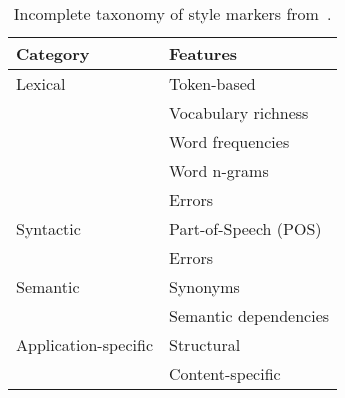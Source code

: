 \begin{table}[h]
    \centering
    \caption[Incomplete taxonomy of style markers.]{Incomplete taxonomy of style markers from~\citet{stamatatos_survey_2009}.}
    \label{tab:stylometric_features}
 
    \begin{tabular}{@{}ll@{}} %
    \toprule
    \textbf{Category} & \textbf{Features} \\ 
    \midrule
    Lexical & Token-based \\ %
     & Vocabulary richness  \\
     & Word frequencies  \\
     & Word n-grams  \\
     & Errors \\
    Syntactic & Part-of-Speech (POS)  \\
     & Errors  \\
    Semantic & Synonyms \\
     & Semantic dependencies \\
    Application-specific & Structural  \\
     & Content-specific\\
     \bottomrule
    \end{tabular}%

\end{table}

